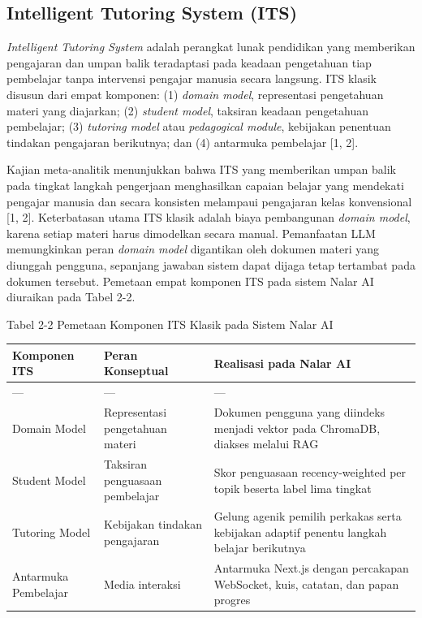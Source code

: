 \documentclass[12pt,a4paper]{article}
\begin{document}
\subsection*{Intelligent Tutoring System (ITS)}
\textit{Intelligent Tutoring System} adalah perangkat lunak pendidikan yang memberikan pengajaran dan umpan balik teradaptasi pada keadaan pengetahuan tiap pembelajar tanpa intervensi pengajar manusia secara langsung. ITS klasik disusun dari empat komponen: (1) \textit{domain model}, representasi pengetahuan materi yang diajarkan; (2) \textit{student model}, taksiran keadaan pengetahuan pembelajar; (3) \textit{tutoring model} atau \textit{pedagogical module}, kebijakan penentuan tindakan pengajaran berikutnya; dan (4) antarmuka pembelajar {[}1, 2{]}.

Kajian meta-analitik menunjukkan bahwa ITS yang memberikan umpan balik pada tingkat langkah pengerjaan menghasilkan capaian belajar yang mendekati pengajar manusia dan secara konsisten melampaui pengajaran kelas konvensional {[}1, 2{]}. Keterbatasan utama ITS klasik adalah biaya pembangunan \textit{domain model}, karena setiap materi harus dimodelkan secara manual. Pemanfaatan LLM memungkinkan peran \textit{domain model} digantikan oleh dokumen materi yang diunggah pengguna, sepanjang jawaban sistem dapat dijaga tetap tertambat pada dokumen tersebut. Pemetaan empat komponen ITS pada sistem Nalar AI diuraikan pada Tabel 2-2.

Tabel 2-2	Pemetaan Komponen ITS Klasik pada Sistem Nalar AI

\begin{table}[h]
\centering
\begin{tabular}{lll}
\toprule
Komponen ITS & Peran Konseptual & Realisasi pada Nalar AI \\
\midrule
--- & --- & --- \\
Domain Model & Representasi pengetahuan materi & Dokumen pengguna yang diindeks menjadi vektor pada ChromaDB, diakses melalui RAG \\
Student Model & Taksiran penguasaan pembelajar & Skor penguasaan recency-weighted per topik beserta label lima tingkat \\
Tutoring Model & Kebijakan tindakan pengajaran & Gelung agenik pemilih perkakas serta kebijakan adaptif penentu langkah belajar berikutnya \\
Antarmuka Pembelajar & Media interaksi & Antarmuka Next.js dengan percakapan WebSocket, kuis, catatan, dan papan progres \\
\bottomrule
\end{tabular}
\end{table}
\end{document}
